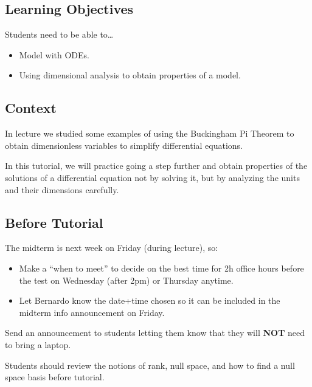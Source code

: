 \subsection*{Learning Objectives}
	Students need to be able to\ldots
		\begin{itemize}\it 
			\item Model with ODEs. \\[-20pt]
			\item Using dimensional analysis to obtain properties of a model.
		\end{itemize}


%	
\subsection*{Context}
	
In lecture we studied some examples of using the Buckingham Pi Theorem to obtain dimensionless variables to simplify differential equations.

In this tutorial, we will practice going a step further and obtain properties of the solutions of a differential equation not by solving it, but by analyzing the units and their dimensions carefully.





\subsection*{Before Tutorial}


The midterm is next week on Friday (during lecture), so:
\begin{itemize}
	\item Make a ``when to meet'' to decide on the best time for 2h office hours before the test on Wednesday (after 2pm) or Thursday anytime.
	\item Let Bernardo know the date+time chosen so it can be included in the midterm info announcement on Friday.
\end{itemize}


Send an announcement to students letting them know that they will \textbf{NOT} need to bring a laptop. %

Students should review the notions of rank, null space, and how to find a null space basis before tutorial.


